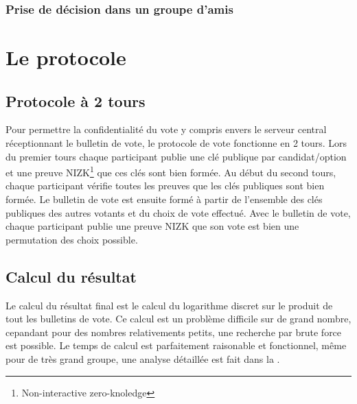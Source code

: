 \documentclass[../report]{subfiles}
\begin{document}
\subsection{Prise de décision dans un groupe d'amis}




%



\chapter{Le protocole}

\section{Protocole à 2 tours}

Pour permettre la confidentialité du vote y compris envers le serveur central réceptionnant
le bulletin de vote, le protocole de vote fonctionne en 2 tours.
Lors du premier tours chaque participant publie une clé publique par candidat/option et une 
preuve NIZK\footnote{Non-interactive zero-knoledge} que ces clés sont bien formée.
Au début du second tours, chaque participant vérifie toutes les preuves que les clés publiques
sont bien formée.
Le bulletin de vote est ensuite formé à partir de l'ensemble des clés publiques des autres 
votants et du choix de vote effectué.
Avec le bulletin de vote, chaque participant publie une preuve NIZK que son vote est bien 
une permutation des choix possible.

\section{Calcul du résultat}\label{sec:res:proto:resultat}

Le calcul du résultat final est le calcul du logarithme discret sur le produit de tout les 
bulletins de vote.
Ce calcul est un problème difficile sur de grand nombre, cepandant pour des nombres 
relativements petits, une recherche par brute force est possible.
Le temps de calcul est parfaitement raisonable et fonctionnel, même pour de très grand groupe, 
une analyse détaillée est fait dans la .
\end{document}
